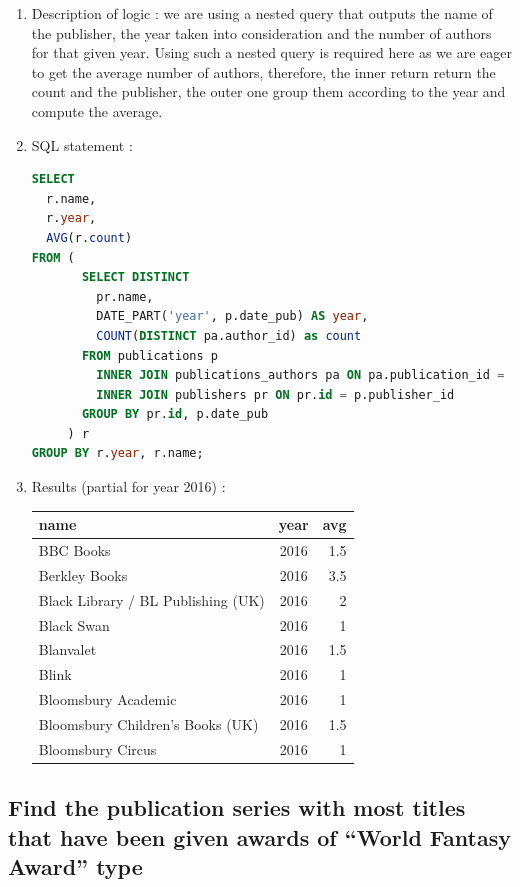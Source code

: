 \documentclass[doubleside, titlepage]{article}
\begin{document}
	\begin{enumerate}
	\item Description of logic : we are using a nested query that outputs the name of the publisher, the year taken into consideration and the number of authors for that given year. Using such a nested query is required here as we are eager to get the average number of authors, therefore, the inner return return the count and the publisher, the outer one group them according to the year and compute the average.
	\item SQL statement :
		\begin{lstlisting}[language=SQL,showspaces=false,basicstyle=\ttfamily,numberstyle=\tiny,commentstyle=\color{gray}]
SELECT
  r.name,
  r.year,
  AVG(r.count)
FROM (
       SELECT DISTINCT
         pr.name,
         DATE_PART('year', p.date_pub) AS year,
         COUNT(DISTINCT pa.author_id) as count
       FROM publications p
         INNER JOIN publications_authors pa ON pa.publication_id = p.id
         INNER JOIN publishers pr ON pr.id = p.publisher_id
       GROUP BY pr.id, p.date_pub
     ) r
GROUP BY r.year, r.name;
		\end{lstlisting}

	\item Results (partial for year 2016) :\\

	\begin{tabular}{|l|c|r|}
	  \hline
		name & year & avg\\
	  \hline
		BBC Books &	2016 & 1.5\\
		Berkley Books & 2016 & 3.5\\
		Black Library / BL Publishing (UK) & 2016 & 2\\
		Black Swan & 2016 & 1\\
		Blanvalet & 2016 & 1.5\\
		Blink & 2016 & 1\\
		Bloomsbury Academic	& 2016 & 1\\
		Bloomsbury Children's Books (UK) & 2016	& 1.5\\
		Bloomsbury Circus & 2016 & 1\\
	  \hline
	\end{tabular}
\end{enumerate}

\subsection{Find the publication series with most titles that have been given awards of “World Fantasy Award” type}
\end{document}
